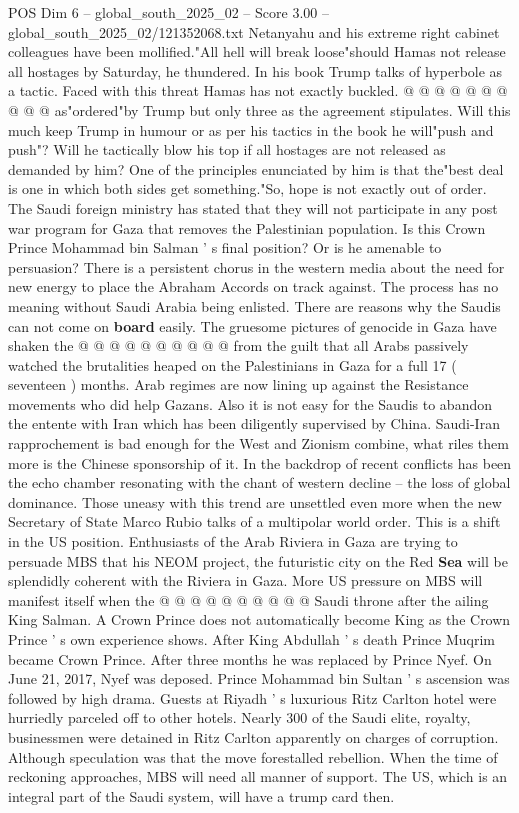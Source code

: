 \begin{textsample}{POS Dim 6 – global\_south\_2025\_02 – Score 3.00 – global\_south\_2025\_02/121352068.txt}
Netanyahu and his extreme right cabinet colleagues have been mollified."All hell will break loose"should Hamas not release all hostages by Saturday, he thundered.
In his book Trump talks of hyperbole as a tactic.
Faced with this threat Hamas has not exactly buckled. @ @ @ @ @ @ @ @ @ @ as"ordered"by Trump but only three as the agreement stipulates.
Will this much keep Trump in humour or as per his tactics in the book he will"push and push"?
Will he tactically blow his top if all hostages are not released as demanded by him?
One of the principles enunciated by him is that the"best deal is one in which both sides get something."So, hope is not exactly out of order.
The Saudi foreign ministry has stated that they will not participate in any post war program for Gaza that removes the Palestinian population.
Is this Crown Prince Mohammad bin Salman ' s final position?
Or is he amenable to persuasion?
There is a persistent chorus in the western media about the need for new energy to place the Abraham Accords on track against.
The process has no meaning without Saudi Arabia being enlisted.
There are reasons why the Saudis can not come on \textbf{board} easily.
The gruesome pictures of genocide in Gaza have shaken the @ @ @ @ @ @ @ @ @ @ from the guilt that all Arabs passively watched the brutalities heaped on the Palestinians in Gaza for a full 17 ( seventeen ) months.
Arab regimes are now lining up against the Resistance movements who did help Gazans.
Also it is not easy for the Saudis to abandon the entente with Iran which has been diligently supervised by China.
Saudi-Iran rapprochement is bad enough for the West and Zionism combine, what riles them more is the Chinese sponsorship of it.
In the backdrop of recent conflicts has been the echo chamber resonating with the chant of western decline -- the loss of global dominance.
Those uneasy with this trend are unsettled even more when the new Secretary of State Marco Rubio talks of a multipolar world order.
This is a shift in the US position.
Enthusiasts of the Arab Riviera in Gaza are trying to persuade MBS that his NEOM project, the futuristic city on the Red \textbf{Sea} will be splendidly coherent with the Riviera in Gaza.
More US pressure on MBS will manifest itself when the @ @ @ @ @ @ @ @ @ @ Saudi throne after the ailing King Salman.
A Crown Prince does not automatically become King as the Crown Prince ' s own experience shows.
After King Abdullah ' s death Prince Muqrim became Crown Prince.
After three months he was replaced by Prince Nyef.
On June 21, 2017, Nyef was deposed.
Prince Mohammad bin Sultan ' s ascension was followed by high drama.
Guests at Riyadh ' s luxurious Ritz Carlton hotel were hurriedly parceled off to other hotels.
Nearly 300 of the Saudi elite, royalty, businessmen were detained in Ritz Carlton apparently on charges of corruption.
Although speculation was that the move forestalled rebellion.
When the time of reckoning approaches, MBS will need all manner of support.
The US, which is an integral part of the Saudi system, will have a trump card then.

\end{textsample}
